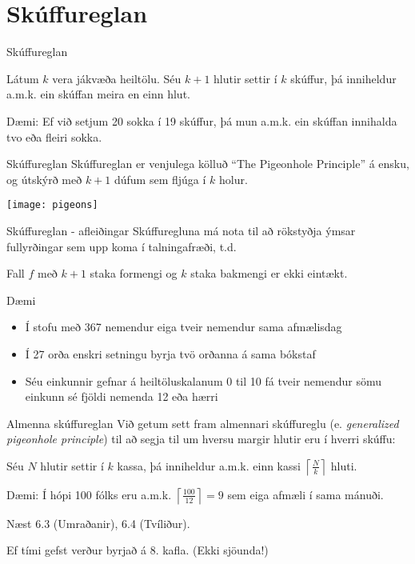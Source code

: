 \documentclass[handout]{beamer}
\begin{document}
\section{Skúffureglan}

\begin{frame}{Skúffureglan}
\begin{tcolorbox}[title=Skúffuregla Dirichlets]
Látum $k$ vera jákvæða heiltölu. Séu $k + 1$ hlutir settir í $k$ skúffur, þá inniheldur a.m.k. ein skúffan meira en einn hlut.
\end{tcolorbox}

Dæmi: Ef við setjum 20 sokka í 19 skúffur, þá mun a.m.k. ein skúffan innihalda tvo eða fleiri sokka.
\end{frame}

\begin{frame}{Skúffureglan}
Skúffureglan er venjulega kölluð ``The Pigeonhole Principle'' á ensku, og útskýrð með $k+1$ dúfum sem fljúga í $k$ holur.
\begin{center}
\texttt{[image: pigeons]}
\end{center}
\end{frame}

\begin{frame}{Skúffureglan - afleiðingar}
Skúffuregluna má nota til að rökstyðja ýmsar fullyrðingar sem upp koma í talningafræði, t.d.
\begin{tcolorbox}
Fall $f$ með $k+1$ staka formengi og $k$ staka bakmengi er ekki eintækt.
\end{tcolorbox}
\end{frame}

\begin{frame}{Dæmi}
\begin{itemize}
 \item Í stofu með 367 nemendur eiga tveir nemendur sama afmælisdag
 \item Í 27 orða enskri setningu byrja tvö orðanna á sama bókstaf
 \item Séu einkunnir gefnar á heiltöluskalanum 0 til 10 fá tveir nemendur sömu einkunn sé fjöldi nemenda 12 eða hærri
\end{itemize}
\end{frame}

\begin{frame}{Almenna skúffureglan}
Við getum sett fram almennari skúffureglu (e. \emph{generalized pigeonhole principle}) til að segja til um hversu margir hlutir eru í hverri skúffu:
\begin{tcolorbox}[title=Almenna skúffureglan]
Séu $N$ hlutir settir í $k$ kassa, þá inniheldur a.m.k. einn kassi $\left\lceil \frac{N}{k}\right\rceil$ hluti.
\end{tcolorbox}
Dæmi: Í hópi 100 fólks eru a.m.k. $\left\lceil \frac{100}{12}\right\rceil = 9$ sem eiga afmæli í sama mánuði.

\end{frame}

\begin{frame}{Næst}
6.3 (Umraðanir), 6.4 (Tvíliður).

Ef tími gefst verður byrjað á 8. kafla. (Ekki sjöunda!)
\end{frame}
\end{document}
